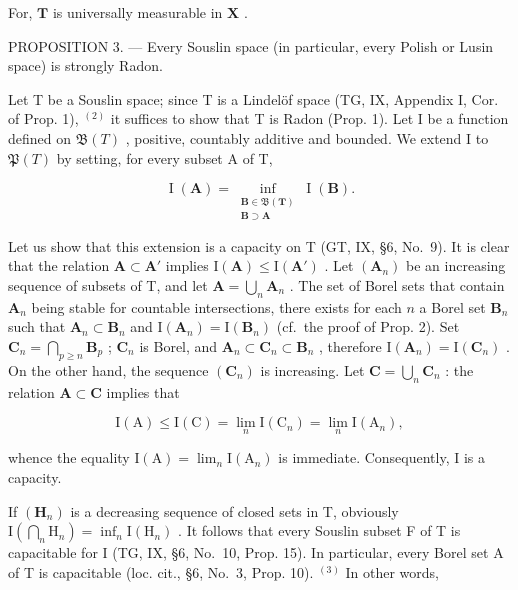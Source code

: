For, \(\mathbf{T}\) is universally measurable in \(\mathbf{X}\) .

PROPOSITION 3. --- Every Souslin space (in particular, every Polish or Lusin space) is strongly Radon.

Let T be a Souslin space; since T is a Lindelöf space (TG, IX, Appendix I, Cor. of Prop. 1), \(^{(2)}\) it suffices to show that T is Radon (Prop. 1). Let I be a function defined on \(\mathfrak{B}(T)\) , positive, countably additive and bounded. We extend I to \(\mathfrak{P}(T)\) by setting, for every subset A of T,

\[
\operatorname{I}(\mathbf{A}) = \inf_{\substack{\mathbf{B}\in \mathfrak{B}(\mathbf{T})\\ \mathbf{B}\supset \mathbf{A}}}\operatorname{I}(\mathbf{B}).
\]

Let us show that this extension is a capacity on T (GT, IX, §6, No.~9). It is clear that the relation \(\mathbf{A} \subset \mathbf{A}'\) implies \(\mathrm{I}(\mathbf{A}) \leqslant \mathrm{I}(\mathbf{A}')\) . Let \((\mathbf{A}_n)\) be an increasing sequence of subsets of T, and let \(\mathbf{A} = \bigcup_{n} \mathbf{A}_n\) . The set of Borel sets that contain \(\mathbf{A}_n\) being stable for countable intersections, there exists for each \(n\) a Borel set \(\mathbf{B}_n\) such that \(\mathbf{A}_n \subset \mathbf{B}_n\) and \(\mathrm{I}(\mathbf{A}_n) = \mathrm{I}(\mathbf{B}_n)\) (cf.~the proof of Prop. 2). Set \(\mathbf{C}_n = \bigcap_{p \geqslant n} \mathbf{B}_p\) ; \(\mathbf{C}_n\) is Borel, and \(\mathbf{A}_n \subset \mathbf{C}_n \subset \mathbf{B}_n\) , therefore \(\mathrm{I}(\mathbf{A}_n) = \mathrm{I}(\mathbf{C}_n)\) . On the other hand, the sequence \((\mathbf{C}_n)\) is increasing. Let \(\mathbf{C} = \bigcup_{n} \mathbf{C}_n\) : the relation \(\mathbf{A} \subset \mathbf{C}\) implies that

\[
\mathrm{I} (\mathrm{A}) \leqslant \mathrm{I} (\mathrm{C}) = \lim _ {n} \mathrm{I} (\mathrm{C} _ {n}) = \lim _ {n} \mathrm{I} (\mathrm{A} _ {n}),
\]

whence the equality \(\mathrm{I}(\mathrm{A})=\lim_{n}\mathrm{I}(\mathrm{A}_{n})\) is immediate. Consequently, I is a capacity.

If \((\mathbf{H}_{n})\) is a decreasing sequence of closed sets in T, obviously \(\mathrm{I}\left(\bigcap_{n}\mathrm{H}_{n}\right)=\inf_{n}\mathrm{I}(\mathrm{H}_{n})\) . It follows that every Souslin subset F of T is capacitable for I (TG, IX, §6, No.~10, Prop. 15). In particular, every Borel set A of T is capacitable (loc. cit., §6, No.~3, Prop. 10). \(^{(3)}\) In other words,

